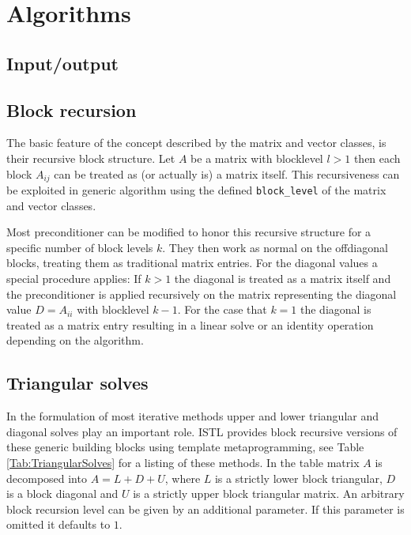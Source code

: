 \documentclass[11pt]{article}
\begin{document}
\section{Algorithms}

\subsection{Input/output}

\subsection{Block recursion}

The basic feature of the concept described by the matrix and vector
classes, is their recursive block structure. Let $A$ be a
matrix with blocklevel $l>1$ then each block $A_{ij}$ can be treated
as (or actually is) a matrix itself. This recursiveness can be
exploited in generic algorithm using the defined
\lstinline!block_level! of the matrix and vector classes.

Most preconditioner can be modified to honor this recursive
structure for a specific number of block levels $k$. They then work as
normal on the offdiagonal blocks, treating them as traditional matrix
entries. For the diagonal values a special procedure applies:  If
$k>1$ the diagonal is treated as a matrix itself and the preconditioner
is applied recursively on the matrix representing the diagonal value
$D=A_{ii}$ with blocklevel $k-1$. For the case that $k=1$ the diagonal
is treated as a 
matrix entry resulting in a linear solve or an identity operation
depending on the algorithm. 

\subsection{Triangular solves}

In the formulation of most iterative methods upper and lower
triangular and diagonal solves play an important role. 
ISTL provides block recursive versions of these generic 
building blocks using template metaprogramming, see Table
\ref{Tab:TriangularSolves} for a listing of these methods. In the table matrix
$A$ is decomposed into $A=L+D+U$, where $L$ is a strictly lower block
triangular, $D$ is a block diagonal and $U$ is a strictly upper block
triangular matrix. An arbitrary block recursion level can be given by an
additional parameter. If this parameter is omitted it defaults to $1$.
\end{document}
